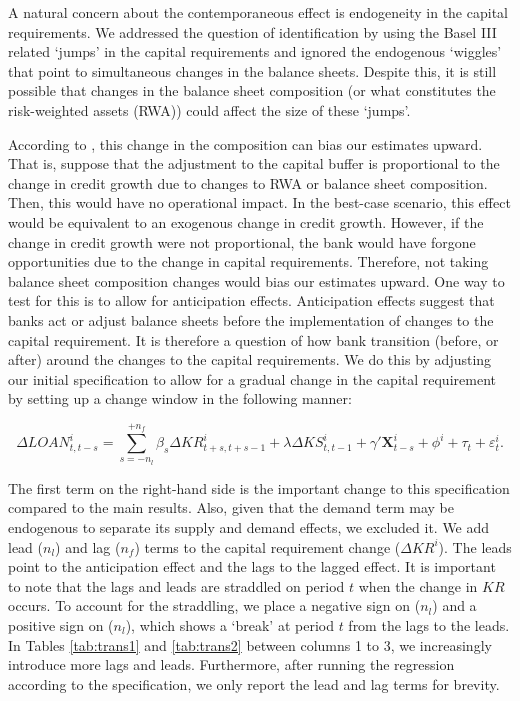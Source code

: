 \documentclass[
  12,
]{article}
\begin{document}
A natural concern about the contemporaneous effect is endogeneity in the capital requirements. We addressed the question of identification by using the Basel III related `jumps' in the capital requirements and ignored the endogenous `wiggles' that point to simultaneous changes in the balance sheets. Despite this, it is still possible that changes in the balance sheet composition (or what constitutes the risk-weighted assets (RWA)) could affect the size of these `jumps'.

According to \citet{fang2020bank}, this change in the composition can bias our estimates upward. That is, suppose that the adjustment to the capital buffer is proportional to the change in credit growth due to changes to RWA or balance sheet composition. Then, this would have no operational impact. In the best-case scenario, this effect would be equivalent to an exogenous change in credit growth. However, if the change in credit growth were not proportional, the bank would have forgone opportunities due to the change in capital requirements. Therefore, not taking balance sheet composition changes would bias our estimates upward. One way to test for this is to allow for anticipation effects. Anticipation effects suggest that banks act or adjust balance sheets before the implementation of changes to the capital requirement. It is therefore a question of how bank transition (before, or after) around the changes to the capital requirements. We do this by adjusting our initial specification to allow for a gradual change in the capital requirement by setting up a change window in the following manner:

\[
\Delta LOAN^i_{t, t-s} = \sum_{s = -n_l}^{+n_f}\beta_s\Delta KR^i_{t+s, t+s-1} + \lambda \Delta KS^i_{t, t-1} + \gamma'  \pmb{X}^i_{t-s} + \phi^i + \tau_t + \varepsilon^i_t.
\]

The first term on the right-hand side is the important change to this specification compared to the main results. Also, given that the demand term may be endogenous to separate its supply and demand effects, we excluded it. We add lead (\(n_l\)) and lag (\(n_f\)) terms to the capital requirement change (\(\Delta KR^i\)). The leads point to the anticipation effect and the lags to the lagged effect. It is important to note that the lags and leads are straddled on period \(t\) when the change in \(KR\) occurs. To account for the straddling, we place a negative sign on (\(n_l\)) and a positive sign on (\(n_l\)), which shows a `break' at period \(t\) from the lags to the leads. In Tables \ref{tab:trans1} and \ref{tab:trans2} between columns 1 to 3, we increasingly introduce more lags and leads. Furthermore, after running the regression according to the specification, we only report the lead and lag terms for brevity.
\end{document}
